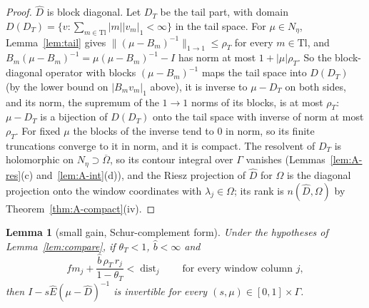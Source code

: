 \documentclass[11pt]{article}
\newtheorem{lemma}{Lemma}[section]
\theoremstyle{definition}
\begin{document}
\begin{proof}
$\hat D$ is block diagonal. Let $D_T$ be the tail part, with domain $D(D_T) = \{v : \sum_{m\in\mathrm{Tl}}|m||v_m|_1 < \infty\}$ in the tail space. For $\mu \in N_\eta$, Lemma~\ref{lem:tail} gives $\|(\mu - B_m)^{-1}\|_{1\to1} \le \rho_T$ for every $m \in \mathrm{Tl}$, and $B_m(\mu - B_m)^{-1} = \mu(\mu - B_m)^{-1} - I$ has norm at most $1 + |\mu|\rho_T$. So the block-diagonal operator with blocks $(\mu - B_m)^{-1}$ maps the tail space into $D(D_T)$ (by the lower bound on $|B_mv_m|_1$ above), it is inverse to $\mu - D_T$ on both sides, and its norm, the supremum of the $1\to1$ norms of its blocks, is at most $\rho_T$: $\mu - D_T$ is a bijection of $D(D_T)$ onto the tail space with inverse of norm at most $\rho_T$. For fixed $\mu$ the blocks of the inverse tend to $0$ in norm, so its finite truncations converge to it in norm, and it is compact. The resolvent of $D_T$ is holomorphic on $N_\eta \supset \overline\Omega$, so its contour integral over $\Gamma$ vanishes (Lemmas~\ref{lem:A-res}(c) and~\ref{lem:A-int}(d)), and the Riesz projection of $\hat D$ for $\Omega$ is the diagonal projection onto the window coordinates with $\lambda_j \in \Omega$; its rank is $n(\hat D, \Omega)$ by Theorem~\ref{thm:A-compact}(iv).
\end{proof}

\begin{lemma}[small gain, Schur-complement form]\label{lem:smallgain}
Under the hypotheses of Lemma~\ref{lem:compare}, if $\theta_T < 1$, $\hat b < \infty$ and
\begin{equation}\label{eq:SC}
  f\!m_j + \frac{\hat b\,\rho_T\,r_j}{1 - \theta_T} < \operatorname{dist}_j \qquad\text{for every window column } j, \tag{SC}
\end{equation}
then $I - s\hat E(\mu - \hat D)^{-1}$ is invertible for every $(s, \mu) \in [0,1] \times \Gamma$.
\end{lemma}
\end{document}
